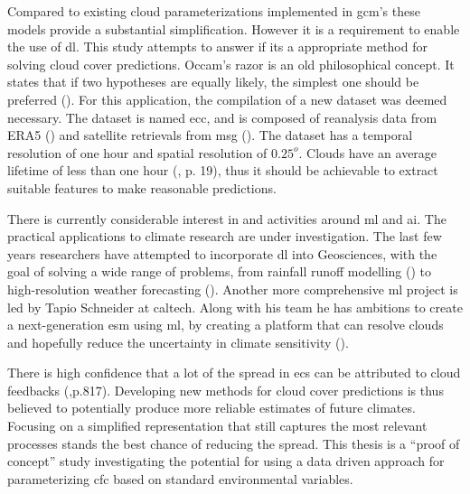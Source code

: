 Compared to existing cloud parameterizations implemented in \acrshort{gcm}'s these models provide a substantial simplification.
However it is a requirement to enable the use of \acrshort{dl}.
This study attempts to answer if its a appropriate method for solving cloud cover predictions.
Occam's razor is an old philosophical concept. It states that if two hypotheses are equally likely, the simplest one should be preferred (\cite{noauthor_occams_nodate}). For this application, the compilation of a new dataset was deemed necessary. The dataset is named \acrfull{ecc}, and is composed of reanalysis data from ERA5 (\cite{Hersbach2018OperationalStatus}) and satellite retrievals from \acrfull{msg} (\cite{Schmetz_meteosat_intro}).
The dataset has a temporal resolution of one hour and spatial resolution of $0.25^o$. Clouds have an average lifetime of less than one hour (\cite{lohmann2016}, p. 19), thus it should be achievable to extract suitable features to make reasonable predictions. 

There is currently considerable interest in and activities around \acrfull{ml} and \acrshort{ai}. The practical applications to climate research are under investigation. The last few years researchers have attempted to incorporate \acrshort{dl} into Geosciences, with the goal of solving a wide range of problems, from rainfall runoff modelling (\cite{hess-23-5089-2019}) to  high-resolution weather forecasting (\cite{Rodrigues2018DeepDownscale:Forecast}). Another more comprehensive \acrshort{ml} project is led by Tapio Schneider at \acrfull{caltech}. Along with his team he has ambitions to create a next-generation \acrfull{esm} using \acrshort{ml}, by creating a platform that can resolve clouds and hopefully reduce the uncertainty in climate sensitivity (\cite{Voosen2018ScienceIntelligence}).

There is high confidence that a lot of the spread in \acrshort{ecs} can be attributed to cloud feedbacks (\cite{IPCC_CH9_climate_models},p.817). Developing new methods for cloud cover predictions is thus believed to potentially produce more reliable estimates of future climates. Focusing on a simplified representation that still captures the most relevant processes stands the best chance of reducing the spread. This thesis is a ``proof of concept'' study investigating the potential for using a data driven approach for parameterizing \acrfull{cfc} based on standard environmental variables. 



